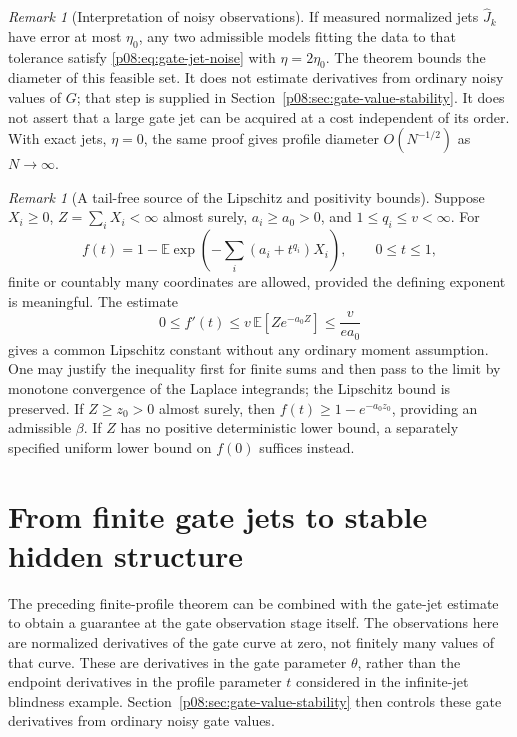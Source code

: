 \documentclass[11pt,letterpaper]{article}
\theoremstyle{definition}
\theoremstyle{remark}
\newtheorem{remark}[theorem]{Remark}
\newcommand{\1}{\mathbf 1}
\begin{document}
\begin{remark}[Interpretation of noisy observations]
If measured normalized jets $\widehat J_k$ have error at most $\eta_0$,
any two admissible models fitting the data to that tolerance satisfy
\eqref{p08:eq:gate-jet-noise} with $\eta=2\eta_0$.  The theorem bounds the
diameter of this feasible set.  It does not estimate derivatives from
ordinary noisy values of $G$; that step is supplied in
Section~\ref{p08:sec:gate-value-stability}. It does not assert that a large gate jet
can be acquired at a cost independent of its order.  With exact jets,
$\eta=0$, the same proof gives profile diameter $O(N^{-1/2})$ as
$N\to\infty$.
\end{remark}

\begin{remark}[A tail-free source of the Lipschitz and positivity bounds]
Suppose $X_i\geq0$, $Z=\sum_iX_i<\infty$ almost surely,
$a_i\geq a_0>0$, and $1\leq q_i\leq v<\infty$.  For
\[
 f(t)=1-\mathbb E\exp\left(-\sum_i(a_i+t^{q_i})X_i\right),
 \qquad 0\leq t\leq1,
\]
finite or countably many coordinates are allowed, provided the defining
exponent is meaningful.  The estimate
\[
 0\leq f'(t)
 \leq v\,\mathbb E[Z e^{-a_0Z}]
 \leq\frac{v}{e a_0}
\]
gives a common Lipschitz constant without any ordinary moment assumption.
One may justify the inequality first for finite sums and then pass to the
limit by monotone convergence of the Laplace integrands; the Lipschitz
bound is preserved.  If $Z\geq z_0>0$ almost surely, then
$f(t)\geq1-e^{-a_0z_0}$, providing an admissible $\beta$.
If $Z$ has no positive deterministic lower bound, a separately specified
uniform lower bound on $f(0)$ suffices instead.
\end{remark}

\section{From finite gate jets to stable hidden structure}
\label{p08:sec:end-to-end-jet}

The preceding finite-profile theorem can be combined with the gate-jet
estimate to obtain a guarantee at the gate observation stage itself.
The observations here are normalized derivatives of the gate curve at
zero, not finitely many values of that curve.  These are derivatives in
the gate parameter $\theta$, rather than the
endpoint derivatives in the profile parameter $t$ considered in the
infinite-jet blindness example. Section~\ref{p08:sec:gate-value-stability}
then controls these gate derivatives from ordinary noisy gate values.
\end{document}
